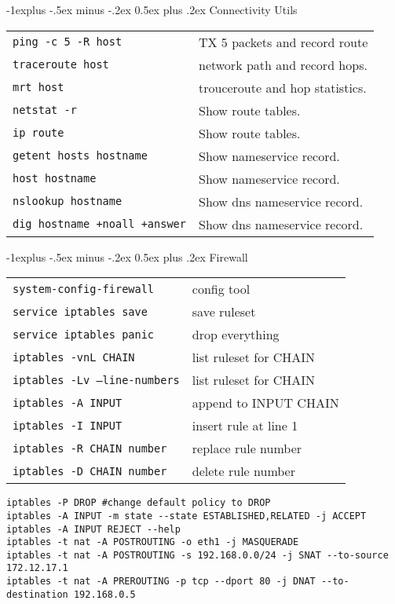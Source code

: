 \documentclass[10pt,landscape]{article}
\makeatletter
\renewcommand{\subsection}{\@startsection{subsection}{2}{0mm}%
                                {-1explus -.5ex minus -.2ex}%
                                {0.5ex plus .2ex}%
                                {\normalfont\normalsize\bfseries}}
\makeatother
\begin{document}
\begin{multicols}{3}
\subsection{Connectivity Utils}
\begin{tabular}{@{}ll@{}}
\texttt{ping -c 5 -R host} & TX 5 packets and record route \\
\texttt{traceroute host} &  network path and record hops. \\
\texttt{mrt host} & trouceroute and hop statistics. \\
\texttt{netstat -r} & Show route tables. \\
\texttt{ip route} & Show route tables. \\
\texttt{getent hosts hostname} & Show nameservice record.  \\
\texttt{host hostname} & Show nameservice record.  \\
\texttt{nslookup hostname} & Show dns nameservice record.  \\
\texttt{dig hostname +noall +answer} & Show dns nameservice record.  \\
\end{tabular}

\subsection{Firewall}
\begin{tabular}{@{}ll@{}}
\texttt{system-config-firewall} & config tool \\
\texttt{service iptables save} & save ruleset \\
\texttt{service iptables panic} & drop everything \\
\texttt{iptables -vnL CHAIN } & list ruleset for CHAIN \\
\texttt{iptables -Lv --line-numbers} & list ruleset for CHAIN \\
\texttt{iptables -A INPUT } & append to INPUT CHAIN \\
\texttt{iptables -I INPUT } & insert rule at line 1 \\
\texttt{iptables -R CHAIN number} & replace rule number \\
\texttt{iptables -D CHAIN number} & delete rule number \\
\end{tabular}
\begin{verbatim}
iptables -P DROP #change default policy to DROP
iptables -A INPUT -m state --state ESTABLISHED,RELATED -j ACCEPT
iptables -A INPUT REJECT --help
iptables -t nat -A POSTROUTING -o eth1 -j MASQUERADE
iptables -t nat -A POSTROUTING -s 192.168.0.0/24 -j SNAT --to-source 172.12.17.1
iptables -t nat -A PREROUTING -p tcp --dport 80 -j DNAT --to-destination 192.168.0.5
\end{verbatim}

\end{multicols}
\end{document}
